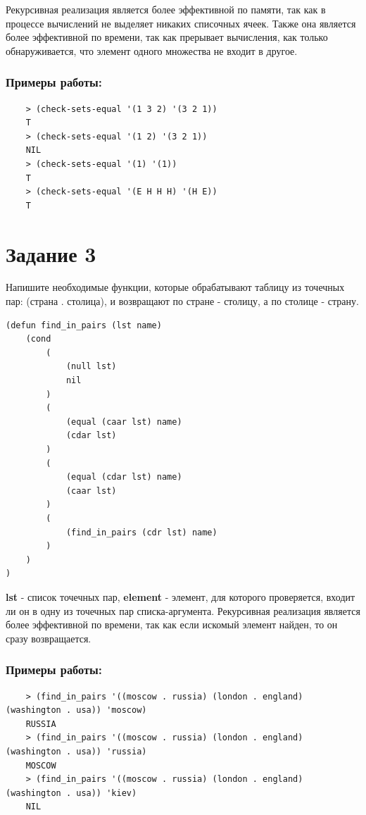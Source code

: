 \documentclass[a4paper, 12pt]{article}
\begin{document}
Рекурсивная реализация является более эффективной по памяти, так как в процессе вычислений не выделяет никаких списочных ячеек. Также она является более эффективной по времени, так как прерывает вычисления, как только обнаруживается, что элемент одного множества не входит в другое.

\subsubsection*{Примеры работы:}
\begin{lstlisting}
	> (check-sets-equal '(1 3 2) '(3 2 1))
	T
	> (check-sets-equal '(1 2) '(3 2 1))
	NIL
	> (check-sets-equal '(1) '(1))
	T
	> (check-sets-equal '(E H H H) '(H E))
	T
\end{lstlisting}

\section*{Задание 3}
Напишите необходимые функции, которые обрабатывают таблицу из точечных пар: (страна . столица), и возвращают по стране - столицу, а по столице - страну.

\begin{lstlisting}[caption=Функция поиска в списке точечных пар]
(defun find_in_pairs (lst name)
	(cond
		(
			(null lst)
			nil
		)
		(
			(equal (caar lst) name)
			(cdar lst)
		)
		(
			(equal (cdar lst) name)
			(caar lst)
		)
		(
			(find_in_pairs (cdr lst) name)
		)
	)
)
\end{lstlisting}
\textbf{lst} - список точечных пар,  \textbf{element} - элемент, для которого проверяется, входит ли он в одну из точечных пар списка-аргумента.
 Рекурсивная реализация является более эффективной по времени, так как если искомый элемент найден, то он сразу возвращается.

\subsubsection*{Примеры работы:}
\begin{lstlisting}
	> (find_in_pairs '((moscow . russia) (london . england) (washington . usa)) 'moscow)
	RUSSIA
	> (find_in_pairs '((moscow . russia) (london . england) (washington . usa)) 'russia)
	MOSCOW
	> (find_in_pairs '((moscow . russia) (london . england) (washington . usa)) 'kiev)
	NIL
\end{lstlisting}
\end{document}
